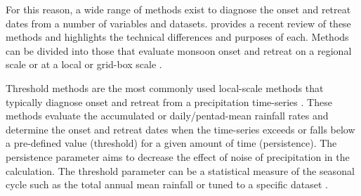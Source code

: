For this reason, a wide range  of methods exist to diagnose the onset and retreat dates from a number of variables and datasets.
\cite{bombardi2019} provides a recent review of these methods and highlights the technical differences and purposes of each. Methods can be divided into those that evaluate monsoon onset and retreat on a regional scale \citep[e.g.][]{webster1992,fasullo2003,garcia2013}  or at a local or grid-box scale \citep[e.g.][]{liebmann2001interannual,cook2009}. 

Threshold methods are the most commonly used local-scale methods that typically diagnose onset and retreat from a precipitation time-series \citep{bombardi2019}. 
These methods evaluate the accumulated  \citep{liebmann2001interannual} or daily/pentad-mean rainfall rates \citep{geil2013} and determine the onset and retreat dates when the time-series exceeds or falls below a pre-defined value (threshold) for a given amount of time (persistence). The persistence parameter aims to decrease the effect of noise of precipitation in the calculation. The threshold parameter can be a statistical measure of the seasonal cycle such as the total annual mean rainfall \citep{arias2012}  or tuned to a specific dataset \citep[e.g.][]{geil2013}.



